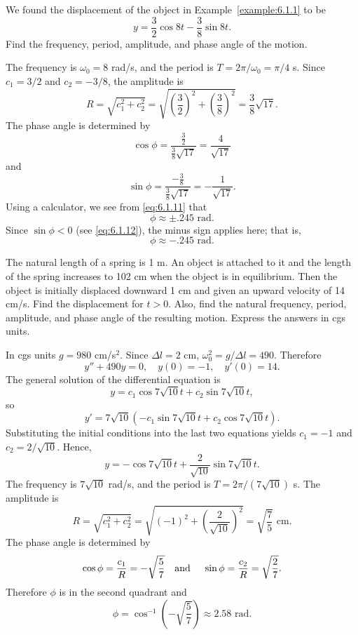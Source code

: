 \begin{example}
  \label{example:6.1.2}\rm We found the displacement of the object in Example~\ref{example:6.1.1} to
  be
  \[
    y=\frac{3}{2}\cos8t-\frac{3}{8}\sin8t.
  \]
  Find the frequency, period, amplitude, and phase angle of the motion.
\end{example}

\begin{examplesolution}
\solution The frequency is $\omega_{0}=8$ rad/s, and the period is $T=2\pi/\omega_{0}=\pi/4$ s.
Since $c_{1}=3/2$ and $c_{2}=-3/8$, the amplitude is
\[
  R=\sqrt{c^{2}_{1}+c^{2}_{2}}=\sqrt{\left(\frac{3}{2}\right)^{2}+\left(\frac{3}{8}\right)^{2}}=\frac{3}{8}\sqrt{17}.
\]
The phase angle is determined by
\begin{equation}
  \label{eq:6.1.11}\cos\phi=\frac{\frac{3}{2}}{{\frac{3}{8}}\sqrt{17}}=\frac{4}{\sqrt{17}}
\end{equation}
and
\begin{equation}
  \label{eq:6.1.12}\sin\phi=\frac{-\frac{3}{8}}{{\frac{3}{8}}\sqrt{17}}=-\frac{1}{\sqrt{17}}.
\end{equation}
Using a calculator, we see from \eqref{eq:6.1.11} that
\[
  \phi\approx\pm.245\mbox{ rad}.
\]
Since $\sin\phi<0$ (see \eqref{eq:6.1.12}), the minus sign applies here; that is,
\[
  \phi\approx-.245\mbox{ rad}.
\]
\end{examplesolution}

\begin{example}
  \label{example:6.1.3}\rm The natural length of a spring is 1 m. An object is attached to it and
  the length of the spring increases to 102 cm when the object is in equilibrium. Then the object is
  initially displaced downward 1 cm and given an upward velocity of 14 cm/s. Find the displacement
  for $t>0$. Also, find the natural frequency, period, amplitude, and phase angle of the resulting
  motion. Express the answers in cgs units.
\end{example}

\begin{examplesolution}
\solution In cgs units $g=980$ cm/s$^{2}$. Since $\Delta l=2$ cm, $\omega_{0}^{2}=g/\Delta l=490$.
Therefore
\[
  y''+490y=0,\quad y(0)=-1,\quad y'(0)=14.
\]
The general solution of the differential equation is
\[
  y=c_{1}\cos7\sqrt{10}t+c_{2}\sin7\sqrt{10}t,
\]
so
\[
  y'=7\sqrt{10}\left(-c_{1}\sin7\sqrt{10}t+c_{2}\cos7\sqrt{10}t\right).
\]
Substituting the initial conditions into the last two equations yields $c_{1}=-1$ and
$c_{2}=2/\sqrt{10}$. Hence,
\[
  y=-\cos7\sqrt{10}t+\frac{2}{\sqrt{10}}\sin7\sqrt{10}t.
\]
The frequency is $7\sqrt{10}$ rad/s, and the period is $T=2\pi/(7\sqrt{10})$ s. The amplitude is
\[
  R=\sqrt{c_{1}^{2}+c_{2}^{2}}=\sqrt{(-1)^{2}+\left(\frac{2}{\sqrt{10}}\right)^{2}}= \sqrt{\frac{7}{5}}\mbox{ cm}.
\]
The phase angle is determined by
\[
  \cos\phi=\frac{c_{1}}{R}=-\sqrt{\frac{5}{7}}\mbox{\quad and \quad}\sin\phi= \frac{c_{2}}{R}=\sqrt{\frac{2}{7}}.
\]
Therefore $\phi$ is in the second quadrant and
\[
  \phi=\cos^{-1}\left(-\sqrt{\frac{5}{7}}\right)\approx2.58\mbox{ rad}.
\]
\end{examplesolution}

